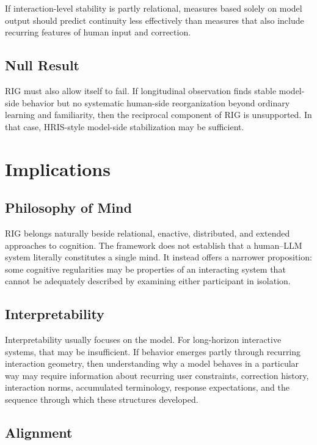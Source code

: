 \documentclass[12pt]{article}
\begin{document}
If interaction-level stability is partly relational, measures based solely on model output should predict continuity less effectively than measures that also include recurring features of human input and correction.

\subsection{Null Result}

RIG must also allow itself to fail. If longitudinal observation finds stable model-side behavior but no systematic human-side reorganization beyond ordinary learning and familiarity, then the reciprocal component of RIG is unsupported. In that case, HRIS-style model-side stabilization may be sufficient.

\section{Implications}

\subsection{Philosophy of Mind}

RIG belongs naturally beside relational, enactive, distributed, and extended approaches to cognition. The framework does not establish that a human--LLM system literally constitutes a single mind. It instead offers a narrower proposition: some cognitive regularities may be properties of an interacting system that cannot be adequately described by examining either participant in isolation.

\subsection{Interpretability}

Interpretability usually focuses on the model. For long-horizon interactive systems, that may be insufficient. If behavior emerges partly through recurring interaction geometry, then understanding why a model behaves in a particular way may require information about recurring user constraints, correction history, interaction norms, accumulated terminology, response expectations, and the sequence through which these structures developed.

\subsection{Alignment}
\end{document}
